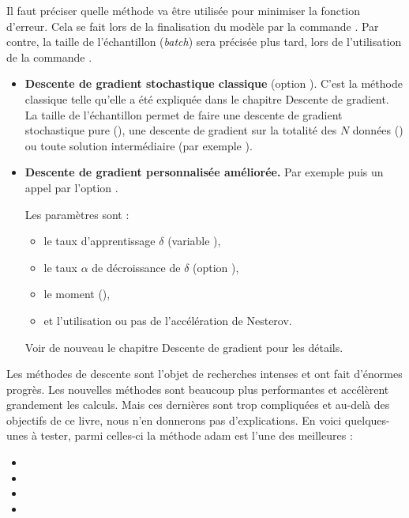 \documentclass[11pt,class=report,crop=false]{standalone}
\begin{document}

Il faut préciser quelle méthode va être utilisée pour minimiser la fonction d'erreur. Cela se fait lors de la finalisation du modèle par la commande . Par contre, la taille de l'échantillon (\emph{batch}) sera précisée plus tard, lors de l'utilisation de la commande .

\begin{itemize}
  \item \textbf{Descente de gradient stochastique classique} (option ). C'est la méthode classique telle qu'elle a été expliquée dans le chapitre \og{}Descente de gradient\fg{}. 
  La taille de l'échantillon permet de faire une descente de gradient stochastique pure 
  (), une descente de gradient sur la totalité des $N$ données ()
  ou toute solution intermédiaire (par exemple ).

  \item \textbf{Descente de gradient personnalisée améliorée.}
  Par exemple 
  puis un appel par l'option .
 
  Les paramètres sont :
  \begin{itemize} 
    \item le taux d'apprentissage $\delta$ (variable ),
    \item le taux $\alpha$ de décroissance de $\delta$ (option ),
    \item le moment (),
    \item et l'utilisation ou pas de l'accélération de Nesterov.
  \end{itemize}
  Voir de nouveau le chapitre \og{}Descente de gradient\fg{} pour les détails.
\end{itemize}  
  

Les méthodes de descente sont l'objet de recherches intenses et ont fait d'énormes progrès.
Les nouvelles méthodes sont beaucoup plus performantes et accélèrent grandement les calculs. Mais ces dernières sont trop compliquées et au-delà des objectifs de ce livre, nous n'en donnerons pas d'explications. En voici quelques-unes à tester, parmi celles-ci la méthode \og{}adam\fg{} est l'une des meilleures :
\begin{itemize}
  \item {}
  \item {}
  \item {}  
  \item {}  
\end{itemize}  
\end{document}
